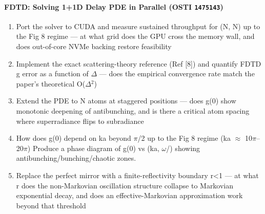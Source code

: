 \documentclass[11pt]{article}
\begin{document}
\paragraph{FDTD: Solving 1+1D Delay PDE in Parallel \textnormal{\small(OSTI \texttt{1475143})}}
\begin{enumerate}[leftmargin=1.6em,itemsep=0.2em,topsep=0.2em,label=Q\arabic*.]
\item Port the solver to CUDA and measure sustained throughput for (N, N) up to the Fig 8 regime --- at what grid does the GPU cross the memory wall, and does out-of-core NVMe backing restore feasibility
\item Implement the exact scattering-theory reference (Ref [8]) and quantify FDTD g error as a function of $\Delta$ --- does the empirical convergence rate match the paper's theoretical O($\Delta$$^2$)
\item Extend the PDE to N atoms at staggered positions --- does g(0) show monotonic deepening of antibunching, and is there a critical atom spacing where superradiance flips to subradiance
\item How does g(0) depend on ka beyond $\pi$/2 up to the Fig 8 regime (ka $\approx$ 10$\pi$--20$\pi$) Produce a phase diagram of g(0) vs (ka, $\omega$/) showing antibunching/bunching/chaotic zones.
\item Replace the perfect mirror with a finite-reflectivity boundary r\textless{}1 --- at what r does the non-Markovian oscillation structure collapse to Markovian exponential decay, and does an effective-Markovian approximation work beyond that threshold
\end{enumerate}
\end{document}
